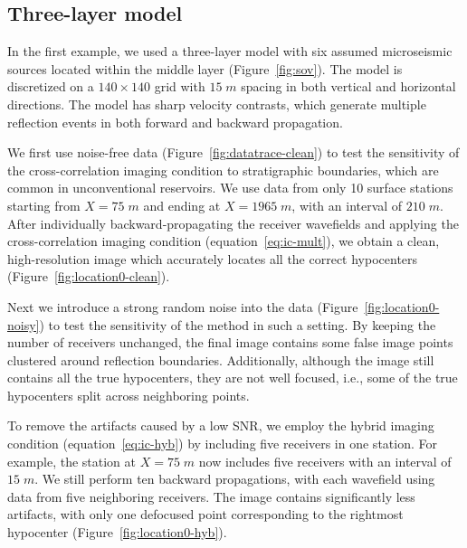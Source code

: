 \subsection{Three-layer model}

In the first example, we used a three-layer model with six assumed microseismic sources located within the middle layer (Figure~\ref{fig:sov}). The model is discretized on a $140 \times 140$ grid with $15\;m$ spacing in both vertical and horizontal directions. The model has sharp velocity contrasts, which generate multiple reflection events in both forward and backward propagation.

We first use noise-free data (Figure~\ref{fig:datatrace-clean}) to test the sensitivity of the cross-correlation imaging condition to stratigraphic boundaries, which are common in unconventional reservoirs. We use data from only 10 surface stations starting from $X=75\;m$ and ending at $X=1965\;m$, with an interval of $210\;m$. After individually backward-propagating the receiver wavefields and applying the cross-correlation imaging condition (equation~\ref{eq:ic-mult}), we obtain a clean, high-resolution image which accurately locates all the correct hypocenters (Figure~\ref{fig:location0-clean}).

Next we introduce a strong random noise into the data (Figure~\ref{fig:location0-noisy}) to test the sensitivity of the method in such a setting. By keeping the number of receivers unchanged, the final image contains some false image points clustered around reflection boundaries. Additionally, although the image still contains all the true hypocenters, they are not well focused, i.e., some of the true hypocenters split across neighboring points.

To remove the artifacts caused by a low SNR, we employ the hybrid imaging condition (equation~\ref{eq:ic-hyb}) by including five receivers in one station. For example, the station at $X=75\;m$ now includes five receivers with an interval of $15\;m$. We still perform ten backward propagations, with each wavefield using data from five neighboring receivers. The image contains significantly less artifacts, with only one defocused point corresponding to the rightmost hypocenter (Figure~\ref{fig:location0-hyb}).


